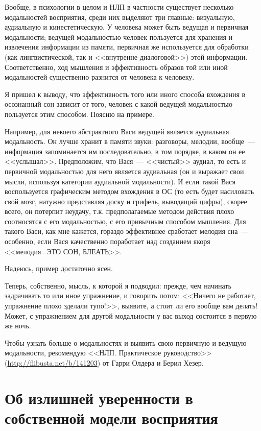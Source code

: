 \documentclass[a4paper,14pt,oneside]{memoir}
\begin{document}
Вообще, в психологии в целом и НЛП в частности существует несколько модальностей восприятия, среди них выделяют три главные: визуальную, аудиальную и кинестетическую. У человека может быть ведущая и первичная модальности; ведущей модальностью человек пользуется для хранения и извлечения информации из памяти, первичная же используется для обработки (как лингвистической, так и <<внутренне-диалоговой>>) этой информации. Соответственно, ход мышления и эффективность образов той или иной модальностей существенно разнится от человека к человеку.

Я пришел к выводу, что эффективность того или иного способа вхождения в осознанный сон зависит от того, человек с какой ведущей модальностью пользуется этим способом. Поясню на примере.

Например, для некоего абстрактного Васи ведущей является аудиальная модальность. Он лучше хранит в памяти звуки: разговоры, мелодии, вообще~--- информация запоминается им последовательно, в том порядке, в каком он ее <<услышал>>. Предположим, что Вася~--- <<чистый>> аудиал, то есть и первичной модальностью для него является аудиальная (он и выражает свои мысли, используя категории аудиальной модальности). И если такой Вася воспользуется графическим методом вхождения в ОС (то есть будет насиловать свой мозг, натужно представляя доску и грифель, выводящий цифры), скорее всего, он потерпит неудачу, т.к. предполагаемые методом действия плохо соотносятся с его модальностью, с его привычным способом мышления. Для такого Васи, как мне кажется, гораздо эффективнее сработает мелодия сна~--- особенно, если Вася качественно поработает над созданием якоря <<мелодия=ЭТО СОН, БЛЕАТЬ>>.

Надеюсь, пример достаточно ясен.
 
Теперь, собственно, мысль, к которой я подводил: прежде, чем начинать задрачивать то или иное упражнение, и говорить потом: <<Ничего не работает, упражнение плохо зделали тупо!>>, выявите, а стоит ли его вообще вам делать! Может, с упражнением для другой модальности у вас выход состоится в первую же ночь.

Чтобы узнать больше о модальностях и выявить свою первичную и ведущую модальности, рекомендую <<НЛП. Практическое руководство>> (\url{http://flibusta.net/b/141203}) от Гарри Олдера и Берил Хезер.




\section{Об излишней уверенности в собственной модели восприятия}
\end{document}
